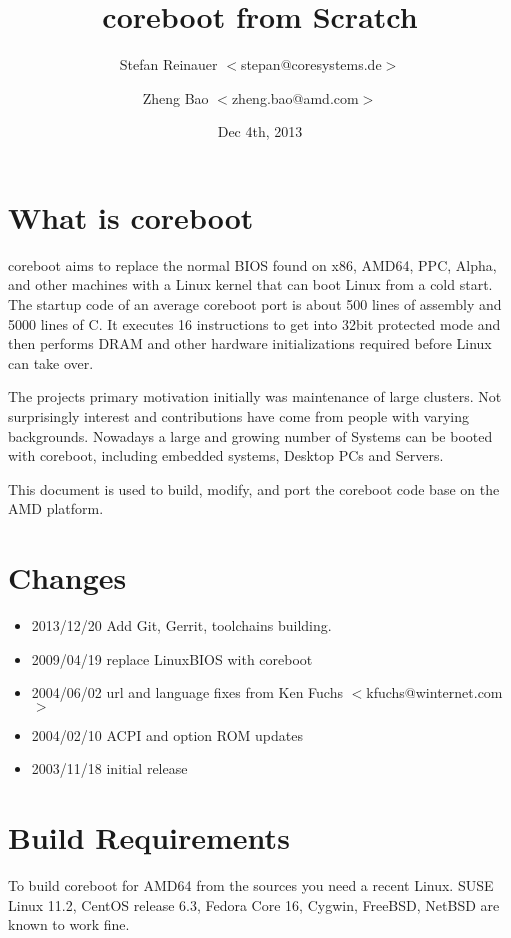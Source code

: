 \documentclass[titlepage,12pt]{article}
\title{coreboot from Scratch}
\author{Stefan Reinauer $<$stepan@coresystems.de$>$\and Zheng Bao $<$zheng.bao@amd.com$>$}
\date{Dec 4th, 2013}
\begin{document}
\maketitle

\thispagestyle{empty}

\tableofcontents

\newpage

\section{What is coreboot}
coreboot aims to replace the normal BIOS found on x86, AMD64, PPC,
Alpha, and other machines with a Linux kernel that can boot Linux from a cold
start. The startup code of an average coreboot port is about 500 lines of
assembly and 5000 lines of C. It executes 16 instructions to get into 32bit
protected mode and then performs DRAM and other hardware initializations
required before Linux can take over.

The projects primary motivation initially was maintenance of large
clusters. Not surprisingly interest and contributions have come from
people with varying backgrounds.  Nowadays a large and growing number of
Systems can be booted with coreboot, including embedded systems,
Desktop PCs and Servers.

This document is used to build, modify, and port the coreboot code
base on the AMD platform.


\section{Changes}

 \begin{itemize}
 \item 2013/12/20 Add Git, Gerrit, toolchains building.
 \item 2009/04/19 replace LinuxBIOS with coreboot
 \item 2004/06/02 url and language fixes from Ken Fuchs $<$kfuchs@winternet.com$>$
 \item 2004/02/10 ACPI and option ROM updates
 \item 2003/11/18 initial release
 \end{itemize}

%
%

\section{Build Requirements}
To build coreboot for AMD64 from the sources you need a recent Linux.
SUSE Linux 11.2, CentOS release 6.3, Fedora Core 16, Cygwin, FreeBSD,
NetBSD are known to work fine.
\end{document}
